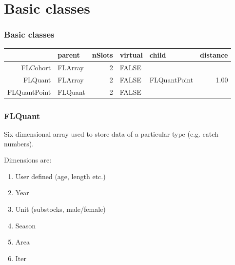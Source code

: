 \documentclass{beamer}%
\begin{document}
\section{Basic classes}
\begin{frame}[containsverbatim]
  \frametitle{Basic classes}

\scriptsize{
\begin{table}[ht]
\begin{center}
\begin{tabular}{rlrllr}
  \hline
 & parent & nSlots & virtual & child & distance \\ 
  \hline
FLCohort & FLArray &   2 & FALSE &  &  \\ 
  FLQuant & FLArray &   2 & FALSE & FLQuantPoint & 1.00 \\ 
  FLQuantPoint & FLQuant &   2 & FALSE &  &  \\ 
   \hline
\end{tabular}
\end{center}
\end{table}}

\end{frame}

\begin{frame}
  \frametitle{FLQuant}

Six dimensional array used to store data of a particular type (e.g. catch numbers).\newline

Dimensions are:
      \begin{enumerate}
	 \item<2-> User defined (age, length etc.)
	 \item<3-> Year
	 \item<4-> Unit (substocks, male/female)
	 \item<5-> Season
	 \item<6-> Area
	 \item<7-> Iter
      \end{enumerate}
\end{frame}
\end{document}
